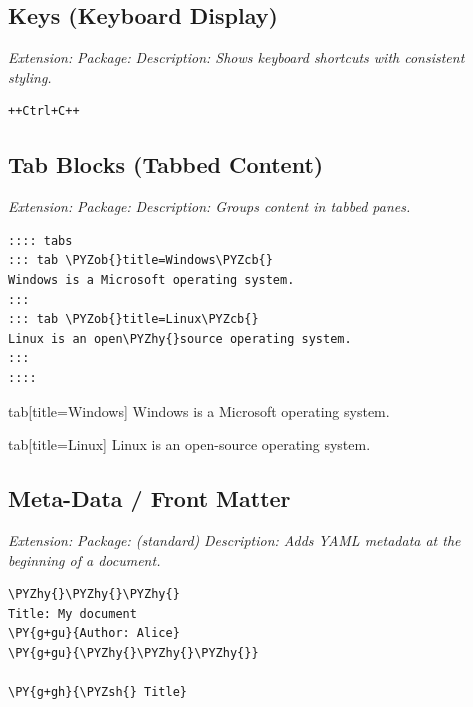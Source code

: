 \documentclass[a4paper,twoside]{article}
\begin{document}
\subsection{Keys (Keyboard Display)}
\emph{Extension: }
\emph{Package: }
\emph{Description: Shows keyboard shortcuts with consistent styling.}
\begin{tscode}[lang=md, engine=pygments]
\begin{Verbatim}[commandchars=\\\{\},breaklines, breakanywhere, commandchars=\\\{\}]
++Ctrl+C++
\end{Verbatim}
\end{tscode}
\begin{displayquote}
\end{displayquote}
\subsection{Tab Blocks (Tabbed Content)}
\emph{Extension: }
\emph{Package: }
\emph{Description: Groups content in tabbed panes.}
\begin{tscode}[lang=md, engine=pygments]
\begin{Verbatim}[commandchars=\\\{\},breaklines, breakanywhere, commandchars=\\\{\}]
:::: tabs
::: tab \PYZob{}title=Windows\PYZcb{}
Windows is a Microsoft operating system.
:::
::: tab \PYZob{}title=Linux\PYZcb{}
Linux is an open\PYZhy{}source operating system.
:::
::::
\end{Verbatim}
\end{tscode}
\begin{tsdiv}{tab}[title=Windows]
Windows is a Microsoft operating system.
\end{tsdiv}
\begin{tsdiv}{tab}[title=Linux]
Linux is an open-source operating system.
\end{tsdiv}
\subsection{Meta-Data / Front Matter}
\emph{Extension: }
\emph{Package:  (standard)}
\emph{Description: Adds YAML metadata at the beginning of a document.}
\begin{tscode}[lang=md, engine=pygments]
\begin{Verbatim}[commandchars=\\\{\},breaklines, breakanywhere, commandchars=\\\{\}]
\PYZhy{}\PYZhy{}\PYZhy{}
Title: My document
\PY{g+gu}{Author: Alice}
\PY{g+gu}{\PYZhy{}\PYZhy{}\PYZhy{}}

\PY{g+gh}{\PYZsh{} Title}
\end{Verbatim}
\end{tscode}
\end{document}
